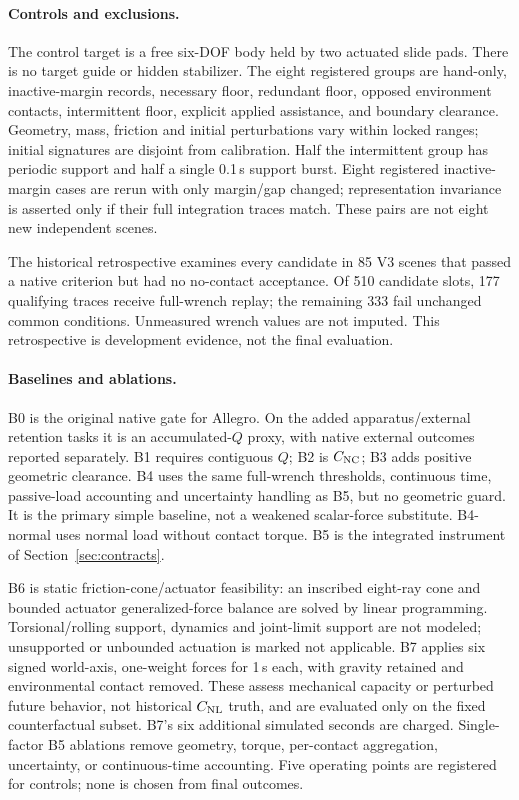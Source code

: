 \paragraph{Controls and exclusions.}
The control target is a free six-DOF body held by two actuated slide pads.
There is no target guide or hidden stabilizer. The eight registered groups are
hand-only, inactive-margin records, necessary floor, redundant floor, opposed
environment contacts, intermittent floor, explicit applied assistance, and
boundary clearance. Geometry, mass, friction and initial perturbations vary
within locked ranges; initial signatures are disjoint from calibration.
Half the intermittent group has periodic support and half a single 0.1\,s
support burst. Eight registered inactive-margin cases are rerun with only
margin/gap changed; representation invariance is asserted only if their full
integration traces match. These pairs are not eight new independent scenes.

The historical retrospective examines every candidate in 85 V3 scenes that
passed a native criterion but had no no-contact acceptance. Of 510 candidate
slots, 177 qualifying traces receive full-wrench replay; the remaining 333 fail
unchanged common conditions. Unmeasured wrench values are not imputed. This
retrospective is development evidence, not the final evaluation.

\paragraph{Baselines and ablations.}
B0 is the original native gate for Allegro. On the added apparatus/external
retention tasks it is an accumulated-$Q$ proxy, with native external outcomes
reported separately. B1 requires contiguous $Q$; B2 is $C_{\mathrm{NC}}$; B3 adds positive
geometric clearance. B4 uses the same full-wrench thresholds, continuous time,
passive-load accounting and uncertainty handling as B5, but no geometric guard.
It is the primary simple baseline, not a weakened scalar-force substitute.
B4-normal uses normal load without contact torque. B5 is the integrated
instrument of Section~\ref{sec:contracts}.

B6 is static friction-cone/actuator feasibility: an inscribed eight-ray cone
and bounded actuator generalized-force balance are solved by linear
programming. Torsional/rolling support, dynamics and joint-limit support are
not modeled; unsupported or unbounded actuation is marked not applicable.
B7 applies six signed world-axis, one-weight forces for 1\,s each, with gravity
retained and environmental contact removed. These assess mechanical capacity
or perturbed future behavior, not historical $C_{\mathrm{NL}}$ truth, and are evaluated
only on the fixed counterfactual subset. B7's six additional simulated seconds
are charged. Single-factor B5 ablations remove geometry, torque, per-contact
aggregation, uncertainty, or continuous-time accounting. Five operating points
are registered for controls; none is chosen from final outcomes.

